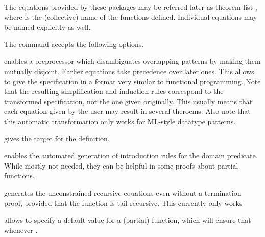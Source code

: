 \begin{isabellebody}
\begin{isamarkuptext}
  The equations provided by these packages may be referred later as
  theorem list , where  is the (collective)
  name of the functions defined.  Individual equations may be named
  explicitly as well.

  The \hyperlink{command.HOL.function}{\mbox{}} command accepts the following
  options.

  \begin{descr}

  \item [\isa{sequential}] enables a preprocessor which
  disambiguates overlapping patterns by making them mutually disjoint.
  Earlier equations take precedence over later ones.  This allows to
  give the specification in a format very similar to functional
  programming.  Note that the resulting simplification and induction
  rules correspond to the transformed specification, not the one given
  originally. This usually means that each equation given by the user
  may result in several theroems.  Also note that this automatic
  transformation only works for ML-style datatype patterns.

  \item [\isa{{\isachardoublequote}{\isasymIN}\ name{\isachardoublequote}}] gives the target for the definition.

  \item [\isa{domintros}] enables the automated generation of
  introduction rules for the domain predicate. While mostly not
  needed, they can be helpful in some proofs about partial functions.

  \item [\isa{tailrec}] generates the unconstrained recursive
  equations even without a termination proof, provided that the
  function is tail-recursive. This currently only works

  \item [\isa{{\isachardoublequote}default\ d{\isachardoublequote}}] allows to specify a default value for a
  (partial) function, which will ensure that 
  whenever .


\end{descr}
\end{isamarkuptext}
\end{isabellebody}
